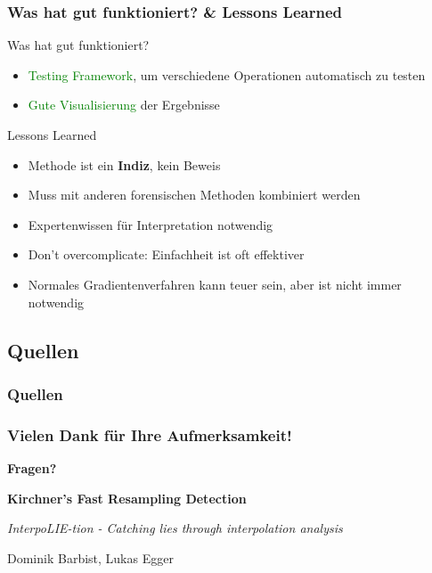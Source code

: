 \documentclass[11pt,t,usepdftitle=false,aspectratio=169]{beamer}
\begin{document}
\begin{frame}
	\frametitle{Was hat gut funktioniert? \& Lessons Learned}
	\begin{exampleblock}{Was hat gut funktioniert?}
		\begin{itemize}
			\item \textcolor{green}{Testing Framework}, um verschiedene Operationen automatisch zu testen
			\item \textcolor{green}{Gute Visualisierung} der Ergebnisse
		\end{itemize}
	\end{exampleblock}
    \begin{block}{Lessons Learned}
        \begin{itemize}
            \item Methode ist ein \textbf{Indiz}, kein Beweis
            \item Muss mit anderen forensischen Methoden kombiniert werden
            \item Expertenwissen für Interpretation notwendig
            \item Don't overcomplicate: Einfachheit ist oft effektiver
            \item Normales Gradientenverfahren kann teuer sein, aber ist nicht immer notwendig
        \end{itemize}
    \end{block}
\end{frame}

\subsection{Quellen}
\begin{frame}
    \frametitle{Quellen}
    \begingroup
    \setlength{\bibitemsep}{2pt}
    \setlength{\itemsep}{0pt}
    \setlength{\parskip}{0pt}
    \renewcommand{\bibfont}{\tiny}
    \printbibliography[heading=none]
    \endgroup
\end{frame}

\begin{frame}
	\frametitle{Vielen Dank für Ihre Aufmerksamkeit!}
	
	\vspace{2em}
	
	\begin{center}
		\Large{\textbf{Fragen?}}
		
		\vspace{1.5em}
		
		\textbf{Kirchner's Fast Resampling Detection}
		
		\textit{InterpoLIE-tion - Catching lies through interpolation analysis}
		
		\vspace{1.5em}
		
		\small{Dominik Barbist, Lukas Egger}
	\end{center}
\end{frame}
\end{document}

